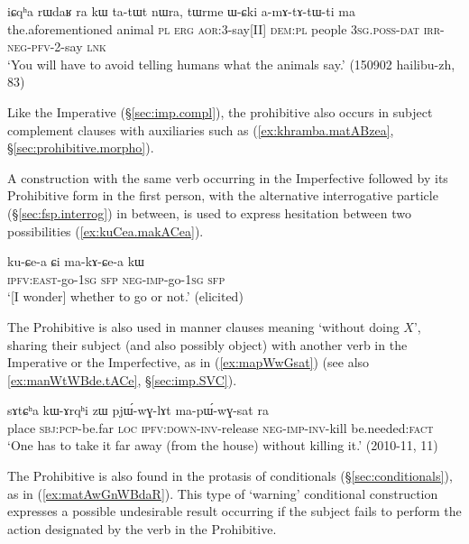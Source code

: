 \begin{exe}
\ex  \label{ex:tatWt.amAtAtWti}
\gll iɕqʰa rɯdaʁ ra kɯ ta-tɯt nɯra, tɯrme ɯ-ɕki a-mɤ-tɤ-tɯ-ti ma \\
the.aforementioned animal \textsc{pl} \textsc{erg} \textsc{aor}:3\flobv{}-say[II] \textsc{dem}:\textsc{pl} people \textsc{3sg}.\textsc{poss}-\textsc{dat} \textsc{irr}-\textsc{neg}-\textsc{pfv}-2-say \textsc{lnk} \\
\glt `You will have to avoid telling humans what the animals say.' (150902 hailibu-zh, 83)
\end{exe}

Like the Imperative (§\ref{sec:imp.compl}), the prohibitive also occurs in subject complement clauses with auxiliaries such as  (\ref{ex:khramba.matABzea}, §\ref{sec:prohibitive.morpho}).


A construction with the same verb occurring in the Imperfective followed by its Prohibitive form in the first person, with the alternative interrogative particle  (§\ref{sec:fsp.interrog}) in between, is used to express hesitation between two possibilities (\ref{ex:kuCea.makACea}).

\begin{exe}
\ex  \label{ex:kuCea.makACea}
\gll ku-ɕe-a ɕi ma-kɤ-ɕe-a kɯ \\
\textsc{ipfv}:\textsc{east}-go-\textsc{1sg} \textsc{sfp} \textsc{neg}-\textsc{imp}-go-\textsc{1sg} \textsc{sfp} \\
\glt `[I wonder] whether to go or not.' (elicited)
\end{exe}

The Prohibitive is also used in manner clauses meaning `without doing $X$', sharing their subject (and also possibly object) with another verb in the Imperative or the Imperfective, as in (\ref{ex:mapWwGsat}) (see also \ref{ex:manWtWBde.tACe}, §\ref{sec:imp.SVC}).

\begin{exe}
\ex  \label{ex:mapWwGsat}
\gll  sɤtɕʰa kɯ-ɤrqʰi zɯ pjɯ́-wɣ-lɤt ma-pɯ́-wɣ-sat ra \\
place \textsc{sbj}:\textsc{pcp}-be.far \textsc{loc} \textsc{ipfv}:\textsc{down}-\textsc{inv}-release \textsc{neg}-\textsc{imp}-\textsc{inv}-kill be.needed:\textsc{fact} \\
\glt `One has to take it far away (from the house) without killing it.' (2010-11, 11)
\end{exe}

The Prohibitive is also found in the protasis of conditionals (§\ref{sec:conditionals}), as in (\ref{ex:matAwGnWBdaR}). This type of `warning' conditional construction expresses a possible undesirable result occurring if the subject fails to perform the action designated by the verb in the Prohibitive.

